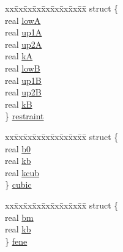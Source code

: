 \begin{DoxyCompactItemize}
\begin{tabbing}
\end{tabbing}\item 
\begin{tabbing}
xx\=xx\=xx\=xx\=xx\=xx\=xx\=xx\=xx\=\kill
struct \{\\
\>real \hyperlink{uniont__iparams_ae1a554426a99ca0625fe5a9cca97403a}{lowA}\\
\>real \hyperlink{uniont__iparams_a9648fb3cd3064ad39200018b9466a6ee}{up1A}\\
\>real \hyperlink{uniont__iparams_a3d080bf1b8f0adbcde996636d21aec5b}{up2A}\\
\>real \hyperlink{uniont__iparams_ab13d91373ce6d97d0c3a8e7b9886b0af}{kA}\\
\>real \hyperlink{uniont__iparams_a32dc037716b3c880bca3d5947a923f66}{lowB}\\
\>real \hyperlink{uniont__iparams_a3f8d79df8e4b64efa3807d0ca17fcb06}{up1B}\\
\>real \hyperlink{uniont__iparams_a177c29d3a2a551309bc5263d3fac53a6}{up2B}\\
\>real \hyperlink{uniont__iparams_abda3baea609874bcf28f8a28b6e0a451}{kB}\\
\} \hyperlink{uniont__iparams_a2b69a27c79982f9d0830afaff8a92b96}{restraint}\\

\end{tabbing}\item 
\begin{tabbing}
xx\=xx\=xx\=xx\=xx\=xx\=xx\=xx\=xx\=\kill
struct \{\\
\>real \hyperlink{uniont__iparams_aaee3232f3405dba9597d086ef9905c32}{b0}\\
\>real \hyperlink{uniont__iparams_a6c8fbc5362283145021c254452016202}{kb}\\
\>real \hyperlink{uniont__iparams_ae00b24476936dcae2fcb8ac07b7de3b0}{kcub}\\
\} \hyperlink{uniont__iparams_af8af336c162b19c91415712c79391ace}{cubic}\\

\end{tabbing}\item 
\begin{tabbing}
xx\=xx\=xx\=xx\=xx\=xx\=xx\=xx\=xx\=\kill
struct \{\\
\>real \hyperlink{uniont__iparams_aedae1554764a6b432e2a73dcb678f30d}{bm}\\
\>real \hyperlink{uniont__iparams_a6c8fbc5362283145021c254452016202}{kb}\\
\} \hyperlink{uniont__iparams_a7c8b8fbf484624af18a857eb0897c8b9}{fene}\\


\end{tabbing}
\end{DoxyCompactItemize}

